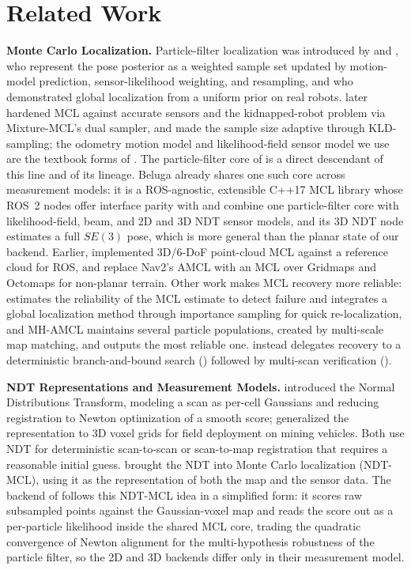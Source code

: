 \section{Related Work}\label{sec:related}

\noindent\textbf{Monte Carlo Localization.}
Particle-filter localization was introduced by \citet{dellaert1999montecarlo} and \citet{fox1999efficient}, who represent the pose posterior as a weighted sample set updated by motion-model prediction, sensor-likelihood weighting, and resampling, and who demonstrated global localization from a uniform prior on real robots. \citet{thrun2001robust} later hardened MCL against accurate sensors and the kidnapped-robot problem via Mixture-MCL's dual sampler, and \citet{fox2003kld} made the sample size adaptive through KLD-sampling; the odometry motion model and likelihood-field sensor model we use are the textbook forms of \citet{thrun2005probabilistic}. The particle-filter core of \sname{} is a direct descendant of this line and of its  lineage. Beluga \citep{puga2024beluga,ekumen2022belugarepo} already shares one such core across measurement models: it is a ROS-agnostic, extensible C++17 MCL library whose ROS~2 nodes offer interface parity with  and combine one particle-filter core with likelihood-field, beam, and 2D and 3D NDT sensor models, and its 3D NDT node estimates a full $SE(3)$ pose, which is more general than the planar state of our  backend. Earlier,  \citep{watanabe2016mcl3dl} implemented 3D/6-DoF point-cloud MCL against a reference cloud for ROS, and \citet{martinrico2023nonplanar} replace Nav2's AMCL with an MCL over Gridmaps and Octomaps for non-planar terrain. Other work makes MCL recovery more reliable: \citet{akai2023reliable} estimates the reliability of the MCL estimate to detect failure and integrates a global localization method through importance sampling for quick re-localization, and MH-AMCL \citep{garcia2023mhamcl} maintains several particle populations, created by multi-scale map matching, and outputs the most reliable one. \sname{} instead delegates recovery to a deterministic branch-and-bound search () followed by multi-scan verification ().

\noindent\textbf{NDT Representations and Measurement Models.}
\citet{biber2003ndt} introduced the Normal Distributions Transform, modeling a scan as per-cell Gaussians and reducing registration to Newton optimization of a smooth score; \citet{magnusson2007scan} generalized the representation to 3D voxel grids for field deployment on mining vehicles. Both use NDT for deterministic scan-to-scan or scan-to-map registration that requires a reasonable initial guess. \citet{saarinen2013ndtmcl} brought the NDT into Monte Carlo localization (NDT-MCL), using it as the representation of both the map and the sensor data. The  backend of \sname{} follows this NDT-MCL idea in a simplified form: it scores raw subsampled points against the Gaussian-voxel map and reads the score out as a per-particle likelihood inside the shared MCL core, trading the quadratic convergence of Newton alignment for the multi-hypothesis robustness of the particle filter, so the 2D and 3D backends differ only in their measurement model.

